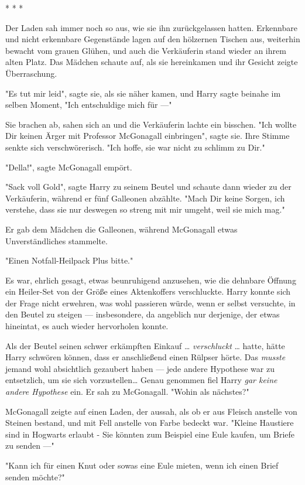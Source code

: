 {* * *

Der Laden sah immer noch so aus, wie sie ihn zurückgelassen hatten. Erkennbare und nicht erkennbare Gegenstände lagen auf den hölzernen Tischen aus, weiterhin bewacht vom grauen Glühen, und auch die Verkäuferin stand wieder an ihrem alten Platz. Das Mädchen schaute auf, als sie hereinkamen und ihr Gesicht zeigte Überraschung.

"Es tut mir leid", sagte sie, als sie näher kamen, und Harry sagte beinahe im selben Moment, "Ich entschuldige mich für ---"

Sie brachen ab, sahen sich an und die Verkäuferin lachte ein bisschen. "Ich wollte Dir keinen Ärger mit Professor McGonagall einbringen", sagte sie. Ihre Stimme senkte sich verschwörerisch. "Ich hoffe, sie war nicht zu schlimm zu Dir."

"Della!", sagte McGonagall empört.

"Sack voll Gold", sagte Harry zu seinem Beutel und schaute dann wieder zu der Verkäuferin, während er fünf Galleonen abzählte. "Mach Dir keine Sorgen, ich verstehe, dass sie nur deswegen so streng mit mir umgeht, weil sie mich mag."

Er gab dem Mädchen die Galleonen, während McGonagall etwas Unverständliches stammelte.

"Einen Notfall-Heilpack Plus bitte."

Es war, ehrlich gesagt, etwas beunruhigend anzusehen, wie die dehnbare Öffnung ein Heiler-Set von der Größe eines Aktenkoffers verschluckte. Harry konnte sich der Frage nicht erwehren, was wohl passieren würde, wenn er selbst versuchte, in den Beutel zu steigen --- insbesondere, da angeblich nur derjenige, der etwas hineintat, es auch wieder hervorholen konnte.

Als der Beutel seinen schwer erkämpften Einkauf … \emph{verschluckt} … hatte, hätte Harry schwören können, dass er anschließend einen Rülpser hörte. Das \emph{musste} jemand wohl absichtlich gezaubert haben --- jede andere Hypothese war zu entsetzlich, um sie sich vorzustellen… Genau genommen fiel Harry \emph{gar keine andere Hypothese} ein. Er sah zu McGonagall. "Wohin als nächstes?"

McGonagall zeigte auf einen Laden, der aussah, als ob er aus Fleisch anstelle von Steinen bestand, und mit Fell anstelle von Farbe bedeckt war. "Kleine Haustiere sind in Hogwarts erlaubt - Sie könnten zum Beispiel eine Eule kaufen, um Briefe zu senden ---"

"Kann ich für einen Knut oder sowas eine Eule mieten, wenn ich einen Brief senden möchte?"

}
